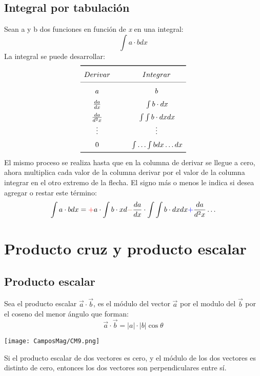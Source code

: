 \documentclass[
	12pt, %
	fleqn, %
	a4paper, %
]{LegrandOrangeBook}
\begin{document}
\section{Integral por tabulación}
Sean a y b dos funciones en función de \textit{x} en una integral:
\begin{displaymath}
\int a\cdot b dx
\end{displaymath}
La integral se puede desarrollar:
\[
    \renewcommand{\arraystretch}{1.5}
    \begin{array}{c @{\hspace*{1.0cm}} c}\toprule
       Derivar & Integrar \\\cmidrule{1-2}
      a\tikzmark{Left 1} & \tikzmark{Right 1}b \\
      \frac{da}{dx} \tikzmark{Left 2} & \tikzmark{Right 2}\int b\cdot dx \\      
      \frac{da}{d^2x}  \tikzmark{Left 3} & \tikzmark{Right 3}\int\int b\cdot dx dx \\      
      \vdots  \tikzmark{Left 4} & \tikzmark{Right 4}\vdots \\
      0  \tikzmark{Left 5} & \tikzmark{Right 5}\int\ldots\int b dx\ldots dx \\
      \bottomrule
    \end{array}
\]
%
%
%
%
El mismo proceso se realiza hasta que en la columna de derivar se llegue a cero, ahora multiplica cada valor de la columna derivar por el valor de la columna integrar en el otro extremo de la flecha. El signo más o menos le indica si desea agregar o restar este término:
\begin{equation}
\label{art:integral pr tabulacion}
\int a\cdot b dx=\textcolor{red}+a\cdot\int b\cdot xd \textcolor{brown}{-}\frac{da}{dx}\cdot\int\int b\cdot dx dx\textcolor{blue}{+}\frac{da}{d^2x}\ldots
\end{equation}
\chapter{Producto cruz y producto escalar}
\section{Producto escalar}
Sea el producto escalar $\vec{a}\cdot\vec{b}$, es el módulo del vector $\vec{a}$ por el modulo del $\vec{b}$ por el coseno del menor ángulo que forman:
\begin{equation}
\vec{a}\cdot\vec{b}=|a|\cdot |b|\cos\theta
\end{equation}
\begin{center}
\texttt{[image: CamposMag/CM9.png]}
\end{center}
Si el producto escalar de dos vectores es cero, y el módulo de los dos vectores es distinto de cero, entonces los dos vectores son perpendiculares entre sí.
\end{document}
